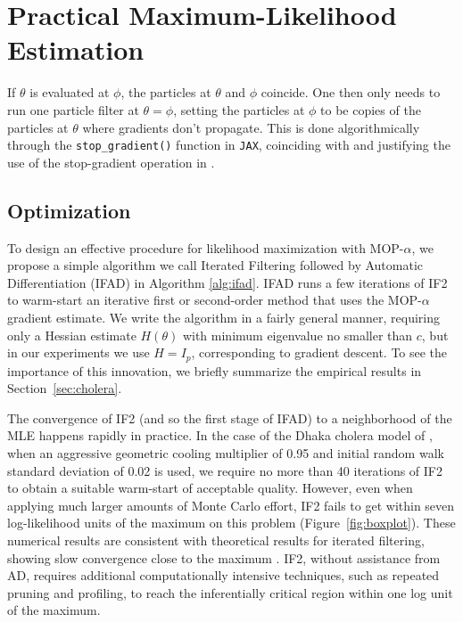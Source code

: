 \documentclass[9pt,twocolumn,pnasresearcharticle]{pnas-new}
\newcommand\arxiv[2]{#2} %
\begin{document}
\arxiv{}{\vspace*{-3mm}}
\section{Practical Maximum-Likelihood Estimation}
\arxiv{}{\vspace*{-1mm}}

If $\theta$ is evaluated at $\phi$, the particles at $\theta$ and $\phi$ coincide. One then only needs to run one particle filter at $\theta=\phi$, setting the particles at $\phi$ to be copies of the particles at $\theta$ where gradients don't propagate. This is done algorithmically through the \texttt{stop\_gradient()} function in \texttt{JAX}, coinciding with and justifying the use of the stop-gradient operation in \cite{scibior21}.

\arxiv{}{\vspace*{-2mm}}
\subsection{Optimization}

To design an effective procedure for likelihood maximization with MOP-$\alpha$, we propose a simple algorithm we call Iterated Filtering followed by Automatic Differentiation (IFAD) in Algorithm \ref{alg:ifad}. IFAD runs a few iterations of IF2 to warm-start an iterative first or second-order method that uses the MOP-$\alpha$ gradient estimate.
We write the algorithm in a fairly general manner, requiring only a Hessian estimate $H(\theta)$ with minimum eigenvalue no smaller than $c$, but in our experiments we use $H=I_p$, corresponding to gradient descent.
To see the importance of this innovation, we briefly summarize the empirical results in Section~\ref{sec:cholera}.

The convergence of IF2 (and so the first stage of IFAD) to a neighborhood of the MLE happens rapidly in practice. 
In the case of the Dhaka cholera model of \cite{king08}, when an aggressive geometric cooling multiplier of 0.95 and initial random walk standard deviation of 0.02 is used, we require no more than 40 iterations of IF2 to obtain a suitable warm-start of acceptable quality. 
However, even when applying much larger amounts of Monte Carlo effort, IF2 fails to get within seven log-likelihood units of the maximum on this problem (Figure~\ref{fig:boxplot}).
These numerical results are consistent with theoretical results for iterated filtering, showing slow convergence close to the maximum \cite{doucet15-if}.
IF2, without assistance from AD, requires additional computationally intensive techniques, such as repeated pruning and profiling, to reach the inferentially critical region within one log unit of the maximum.
\end{document}
